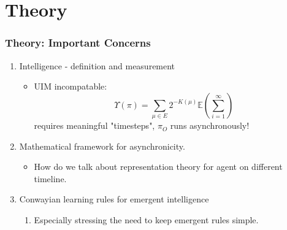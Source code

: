 \documentclass{beamer}
\begin{document}
\section{Theory}
    \begin{frame}
        \frametitle{Theory: Important Concerns}
        	\begin{enumerate}
	        	\item Intelligence - definition and measurement
                \begin{itemize}
					\item UIM incompatable:
                    \begin{equation}
                  \Upsilon(\pi) = \sum_{\mu \in E}2^{-K(\mu)}  \mathbb{E}\left(\sum_{i=1}^\infty \right) 
                  \end{equation}
                  requires meaningful "timesteps", $\pi_O$ runs asynchronously!
                \end{itemize}
                \item Mathematical framework for asynchronicity.
                \begin{itemize}
                \item How do we talk about representation theory for agent on different timeline.
                \end{itemize}
                \item Conwayian learning rules for emergent intelligence
                \begin{enumerate}
                	\item Especially stressing the need to keep emergent rules simple.
                \end{enumerate}
            \end{enumerate}
    \end{frame}



 
\end{document}
